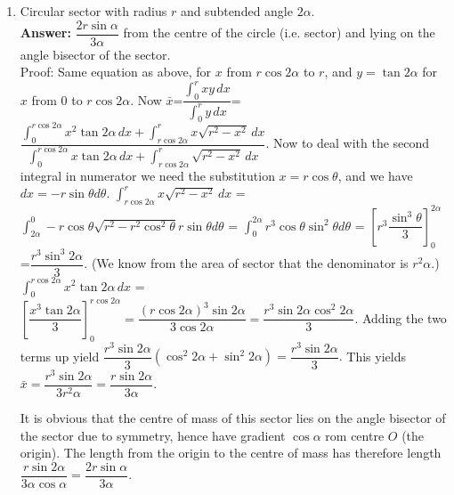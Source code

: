 \documentclass[11pt,a4paper]{article}
\begin{document}
\begin{enumerate}
\item Circular sector with radius $r$ and subtended angle $2\alpha$.\\
\textbf {Answer: }$\dfrac{2r\sin\alpha}{3\alpha}$ from the centre of the circle (i.e. sector) and lying on the angle bisector of the sector.\\
Proof: Same equation as above, for $x$ from $r\cos 2\alpha$ to $r$, and $y=\tan 2\alpha$ for $x$ from 0 to $r\cos 2\alpha$. Now $\bar{x}$=$\dfrac{\int _0^r xy\, dx}{\int_0^r y\, dx}$=$\dfrac{\int ^{r\cos 2\alpha}_0 x^{2}\tan 2\alpha\, dx+\int _{r\cos 2\alpha}^r x\sqrt{r^2-x^2}\, dx}{\int ^{r\cos 2\alpha}_0 x\tan 2\alpha\, dx+\int_{r\cos 2\alpha}^r \sqrt{r^2-x^2}\, dx}$. Now to deal with the second integral in numerator we need the substitution $x=r\cos\theta$, and we have $dx=-r\sin\theta d\theta$. $\int_{r\cos 2\alpha}^r x\sqrt{r^2-x^2}\, dx$ = $\int_{2\alpha}^0 -r\cos\theta\sqrt{r^2-r^2\cos^2\theta}r\sin\theta d\theta$ = $\int^{2\alpha}_0 r^3\cos\theta\sin^{2}\theta d\theta$ = $\left[r^3\dfrac{\sin^3\theta}{3}\right]_0^{2\alpha}$ =$\dfrac{r^3\sin^3 2\alpha}{3}$. (We know from the area of sector that the denominator is $r^2\alpha$.) $\int ^{r\cos 2\alpha}_0 x^{2}\tan 2\alpha\, dx$ = $\left[\dfrac{x^3 \tan 2\alpha}{3}\right]_0^{r\cos 2\alpha} = \dfrac{(r\cos 2\alpha)^{3}\sin 2\alpha}{3\cos 2\alpha}=\dfrac{r^3\sin 2\alpha \cos^{2} 2\alpha}{3}.$ Adding the two terms up yield $\dfrac{r^3\sin 2\alpha}{3}(\cos^2 2\alpha+\sin^2 2\alpha)=\dfrac{r^3\sin 2\alpha}{3}.$ This yields $\bar{x}=\dfrac{r^3\sin 2\alpha}{3r^2 \alpha}=\dfrac{r\sin 2\alpha}{3\alpha}.$

It is obvious that the centre of mass of this sector lies on the angle bisector of the sector due to symmetry, hence have gradient $\cos\alpha$ rom centre $O$ (the origin). The length from the origin to the centre of mass has therefore length $\dfrac{r\sin 2\alpha}{3\alpha\cos\alpha}=\dfrac{2r\sin\alpha}{3\alpha}.$


\end{enumerate}
\end{document}
